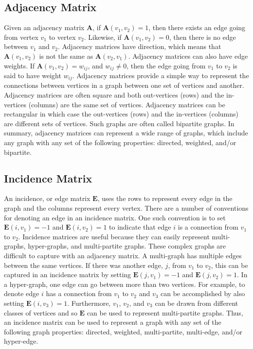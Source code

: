 \subsection{Adjacency Matrix}
Given an adjacency matrix $\mathbf{A}$, if $\mathbf{A}(v_1,v_2) = 1$, then there exists an edge going from vertex $v_1$ to vertex $v_2$.  Likewise, if $\mathbf{A}(v_1,v_2) = 0$, then there is no edge between $v_1$ and $v_2$.  Adjacency matrices have direction, which means that $\mathbf{A}(v_1,v_2)$ is not the same as $\mathbf{A}(v_2,v_1)$.  Adjacency matrices can also have edge weights.  If $\mathbf{A}(v_1,v_2) = w_{ij}$, and $w_{ij} \neq 0$, then the edge going from $v_1$ to $v_2$ is said to have weight $w_{ij}$.  Adjacency matrices provide a simple way to represent the connections between vertices in a graph between one set of vertices and another.  Adjacency matrices are often square and both out-vertices (rows) and the in-vertices (columns) are the same set of vertices.  Adjacency matrices can be rectangular in which case the out-vertices (rows) and the in-vertices (columns) are different sets of vertices.  Such graphs are often called bipartite graphs.  In summary, adjacency matrices can represent a wide range of graphs, which include any graph with any set of the following properties: directed, weighted, and/or bipartite.

\subsection{Incidence Matrix}
An incidence, or edge matrix $\mathbf{E}$, uses the rows to represent every edge in the graph and the columns represent every vertex.  There are a number of conventions for denoting an edge in an incidence matrix.  One such convention is to set $\mathbf{E}(i,v_1) = -1$ and $\mathbf{E}(i,v_2) = 1$ to indicate that edge $i$ is a connection from $v_1$ to $v_2$.  Incidence matrices are useful because they can easily represent multi-graphs, hyper-graphs, and multi-partite graphs.  These complex graphs are difficult to capture with an adjacency matrix.  A multi-graph has multiple edges between the same vertices.  If there was another edge, $j$, from $v_1$ to $v_2$, this can be captured in an incidence matrix by setting $\mathbf{E}(j,v_1) = -1$ and $\mathbf{E}(j,v_2) = 1$.  In a hyper-graph, one edge can go between more than two vertices.  For example, to denote edge $i$ has a connection from $v_1$ to $v_2$ and $v_3$ can be accomplished by also setting $\mathbf{E}(i,v_3) = 1$.  Furthermore, $v_1$, $v_2$, and $v_3$ can be drawn from  different classes of vertices and so $\mathbf{E}$ can be used to represent multi-partite graphs.  Thus, an incidence matrix can be used to represent a graph with any set of the following graph properties: directed, weighted, multi-partite, multi-edge, and/or hyper-edge.

